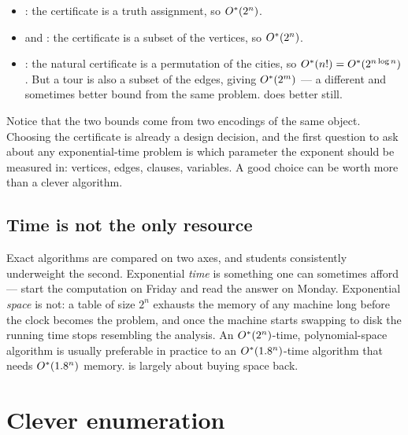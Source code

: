 \begin{example}\label{ex:trivial-algorithms}
\begin{itemize}[leftmargin=*,nosep]
  \item {}: the certificate is a truth assignment, so
        $O^{*}(2^n)$.
  \item {} and : the certificate is a
        subset of the vertices, so $O^{*}(2^n)$.
  \item {}: the natural certificate is a permutation of the cities, so
        $O^{*}(n!) = O^{*}(2^{n\log n})$. But a tour is also a subset of the
        edges, giving $O^{*}(2^m)$ --- a different and sometimes better bound
        from the same problem.  does better still.
\end{itemize}
\end{example}

\begin{intuition}
Notice that the two  bounds come from two encodings of the same
object. Choosing the certificate is already a design decision, and the first
question to ask about any exponential-time problem is which parameter the
exponent should be measured in: vertices, edges, clauses, variables. A good
choice can be worth more than a clever algorithm.
\end{intuition}

\subsection{Time is not the only resource}

Exact algorithms are compared on two axes, and students consistently
underweight the second. Exponential \emph{time} is something one can sometimes
afford --- start the computation on Friday and read the answer on Monday.
Exponential \emph{space} is not: a table of size $2^n$ exhausts the memory of
any machine long before the clock becomes the problem, and once the machine
starts swapping to disk the running time stops resembling the analysis. An
$O^{*}(2^n)$-time, polynomial-space algorithm is usually preferable in
practice to an $O^{*}(1.8^n)$-time algorithm that needs $O^{*}(1.8^n)$
memory.  is largely about buying space back.

\section{Clever enumeration}
\label{sec:clever-enumeration}

